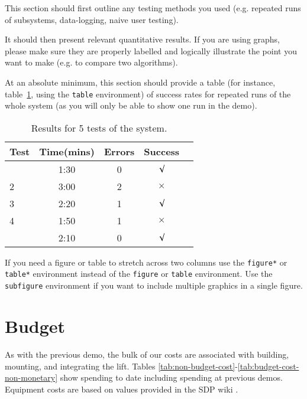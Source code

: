 \documentclass{article}
\begin{document}
This section should first outline any testing methods you used (e.g. repeated runs of subsystems, data-logging, naive user testing). 

It should then present relevant quantitative results. If you are using graphs, please make sure they are properly labelled and logically illustrate the point you want to make (e.g. to compare two algorithms).


At an absolute minimum, this section should provide a table (for instance, table~\ref{tab:sample-table}, using the \verb+table+ environment) of success rates for repeated runs of the whole system (as you will only be able to show one run in the demo).

\begin{table}[h]
\vskip 3mm
\begin{center}
\begin{small}
\begin{sc}
\begin{tabular}{lcccr}
\hline
\abovespace\belowspace
Test  & Time(mins) & Errors & Success \\
\hline
\abovespace
1    & 1:30 & 0 & $\surd$ \\
2    & 3:00 & 2 & $\times$\\
3    & 2:20 & 1 & $\surd$ \\
4    & 1:50 & 1 & $\times$\\
\belowspace
5    & 2:10 & 0 & $\surd$ \\
\hline
\end{tabular}
\end{sc}
\end{small}
\caption{Results for 5 tests of the system.}
\label{tab:sample-table}
\end{center}
\vskip -3mm
\end{table}

If you need a figure or table to stretch across two columns use the \verb+figure*+ or \verb+table*+ environment instead of the \verb+figure+ or \verb+table+ environment.  Use the \verb+subfigure+ environment if you want to include multiple graphics in a single figure.

\section{Budget}
As with the previous demo, the bulk of our costs are associated with building, mounting, and integrating the lift. Tables \ref{tab:non-budget-cost}-\ref{tab:budget-cost-non-monetary} show spending to date including spending at previous demos. Equipment costs are based on values provided in the SDP wiki \cite{sdpcosts}.
\end{document}

